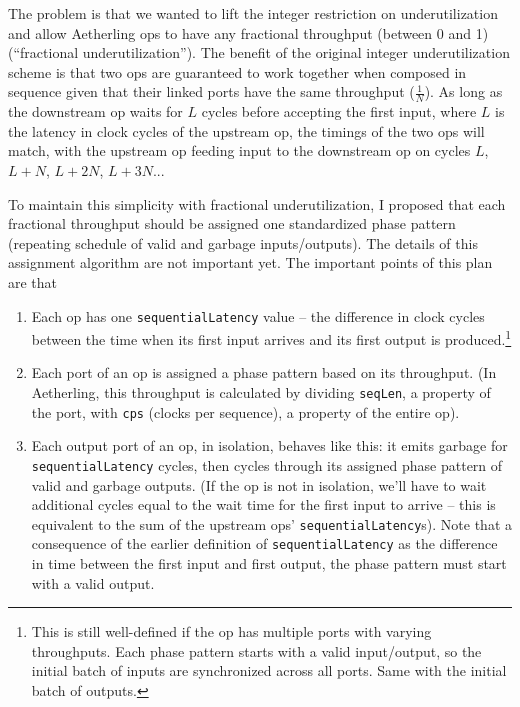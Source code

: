 \documentclass[12pt]{article}
\begin{document}
The problem is that we wanted to lift the integer restriction on
underutilization and allow Aetherling ops to have any fractional
throughput (between 0 and 1) (``fractional underutilization''). The
benefit of the original integer underutilization scheme is that two
ops are guaranteed to work together when composed in sequence given
that their linked ports have the same throughput ($\frac{1}{N}$). As
long as the downstream op waits for $L$ cycles before accepting the
first input, where $L$ is the latency in clock cycles of the upstream
op, the timings of the two ops will match, with the upstream op
feeding input to the downstream op on cycles $L$, $L+N$, $L+2N$,
$L+3N$...

To maintain this simplicity with fractional underutilization, I
proposed that each fractional throughput should be assigned one
standardized phase pattern (repeating schedule of valid and garbage
inputs/outputs). The details of this assignment algorithm are not
important yet. The important points of this plan are that
\begin{enumerate}
\item Each op has one \texttt{sequentialLatency} value -- the
  difference in clock cycles between the time when its first input
  arrives and its first output is produced.\footnote{This is still
    well-defined if the op has multiple ports with varying
    throughputs. Each phase pattern starts with a valid input/output,
    so the initial batch of inputs are synchronized across all
    ports. Same with the initial batch of outputs. }
\item Each port of an op is assigned a phase pattern based on its
  throughput. (In Aetherling, this throughput is calculated by
  dividing \texttt{seqLen}, a property of the port, with \texttt{cps}
  (clocks per sequence), a property of the entire op).
\item Each output port of an op, in isolation, behaves like this: it
  emits garbage for \texttt{sequentialLatency} cycles, then cycles
  through its assigned phase pattern of valid and garbage outputs. (If
  the op is not in isolation, we'll have to wait additional cycles
  equal to the wait time for the first input to arrive -- this is
  equivalent to the sum of the upstream ops'
  \texttt{sequentialLatency}s). Note that a consequence of the earlier
  definition of \texttt{sequentialLatency} as the difference in time
  between the first input and first output, the phase pattern must
  start with a valid output.
\end{enumerate}
\end{document}
